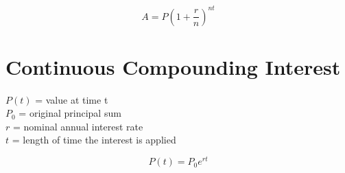 \begin{equation*}
  A = P(1 + \frac{r}{n})^{nt}
\end{equation*}

\newpage

\section{Continuous Compounding Interest}

\noindent $P(t)$ = value at time t\\
$P_0$ = original principal sum\\
$r$ = nominal annual interest rate\\
$t$ = length of time the interest is applied

\begin{equation*}
  P(t) = P_0 e^{rt}
\end{equation*}
